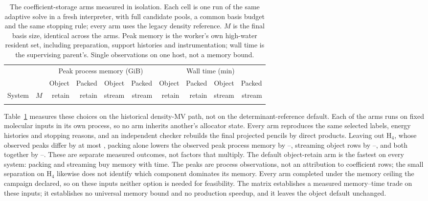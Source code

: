 \documentclass[aps,pra,reprint,superscriptaddress,nofootinbib,floatfix,
  showkeys]{revtex4-2}
\begin{document}
\begin{table}
  \caption{The coefficient-storage arms measured in isolation. Each cell is
  one run of the same adaptive solve in a fresh interpreter, with full
  candidate pools, a common basis budget and the same stopping rule; every arm
  uses the legacy density reference. $M$ is the final basis size, identical
  across the arms. Peak memory is the worker's
  own high-water resident set, including preparation, support histories and
  instrumentation; wall time is the supervising parent's. Single observations
  on one host, not a memory bound.}
  \label{tab:storage}
  \footnotesize
  \begin{ruledtabular}
  \begin{tabular}{lrrrrrrrrr}
  & & \multicolumn{4}{c}{Peak process memory (GiB)} & \multicolumn{4}{c}{Wall time (min)} \\
  & & Object & Packed & Object & Packed & Object & Packed & Object & Packed \\
  System & $M$ & retain & retain & stream & stream & retain & retain & stream & stream \\
  \colrule
  
  \end{tabular}
  \end{ruledtabular}
\end{table}

Table~\ref{tab:storage} measures these choices on the historical density-MV
path, not on the determinant-reference default. Each of the
\cqcPolicyArms{} arms runs on \cqcPolicySystems{} fixed molecular inputs in its
own process, so no arm inherits another's allocator state. Every arm reproduces
the same selected labels, energy histories and stopping reasons, and an independent
checker rebuilds the final projected pencils by direct products. Leaving out
H$_4$, whose observed peaks differ by at most \cqcHFourPolicySpread{}, packing alone lowers
the observed peak process memory by \cqcPackSaveMin{}--\cqcPackSaveMax{},
streaming object rows by \cqcStreamSaveMin{}--\cqcStreamSaveMax{}, and both
together by \cqcBothSaveMin{}--\cqcBothSaveMax{}. These are separate measured
outcomes, not factors that multiply. The default object-retain arm is the
fastest on every system: packing and streaming buy memory with time. The peaks
are process observations, not an attribution to coefficient rows; the small
separation on H$_4$ likewise does not identify which component dominates its
memory. Every arm
completed under the memory ceiling the campaign declared, so on these inputs
neither option is needed for feasibility. The matrix establishes a measured
memory--time trade on these \cqcPolicySystems{} inputs; it establishes no
universal memory bound and no production speedup, and it leaves the object
default unchanged.
\end{document}
